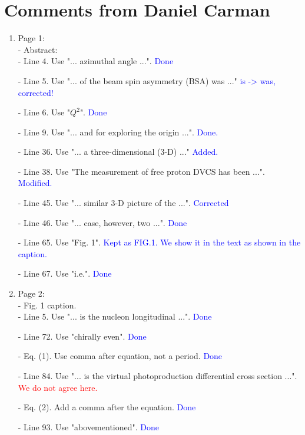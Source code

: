 \documentclass[a4paper,11pt,twoside]{article}
\date{\today}
\begin{document}
\section{Comments from Daniel Carman}


\begin{enumerate}

\item Page 1:\\
 - Abstract:\\
   - Line 4. Use "... azimuthal angle ...".
   \textcolor{blue}{Done} 

   - Line 5. Use "... of the beam spin asymmetry (BSA) was ..."
   \textcolor{blue}{is -> was, corrected!}

   - Line 6. Use "$Q^2$".
   \textcolor{blue}{Done}

   - Line 9. Use "... and for exploring the origin ...".
   \textcolor{blue}{Done.}

 - Line 36. Use "... a three-dimensional (3-D) ..."
   \textcolor{blue}{Added.}

 - Line 38. Use "The measurement of free proton DVCS has been ...".
   \textcolor{blue}{Modified.}

 - Line 45. Use "... similar 3-D picture of the ...".
   \textcolor{blue}{Corrected}

 - Line 46. Use "... case, however, two ...".
   \textcolor{blue}{Done}

 - Line 65. Use "Fig. 1".
   \textcolor{blue}{Kept as FIG.1. We show it in the text as shown in the 
      caption.}

 - Line 67. Use "i.e.".
   \textcolor{blue}{Done}
~\\
\item Page 2:\\
 - Fig. 1 caption.\\
   - Line 5. Use "... is the nucleon longitudinal ...".
   \textcolor{blue}{Done}

 - Line 72. Use "chirally even".
   \textcolor{blue}{Done}

 - Eq. (1). Use comma after equation, not a period.
   \textcolor{blue}{Done}

 - Line 84. Use "... is the virtual photoproduction differential cross section 
      ...".
   \textcolor{red}{We do not agree here.}

 - Eq. (2). Add a comma after the equation.
   \textcolor{blue}{Done}
 
 - Line 93. Use "abovementioned".
   \textcolor{blue}{Done}
 

\end{enumerate}
\end{document}
